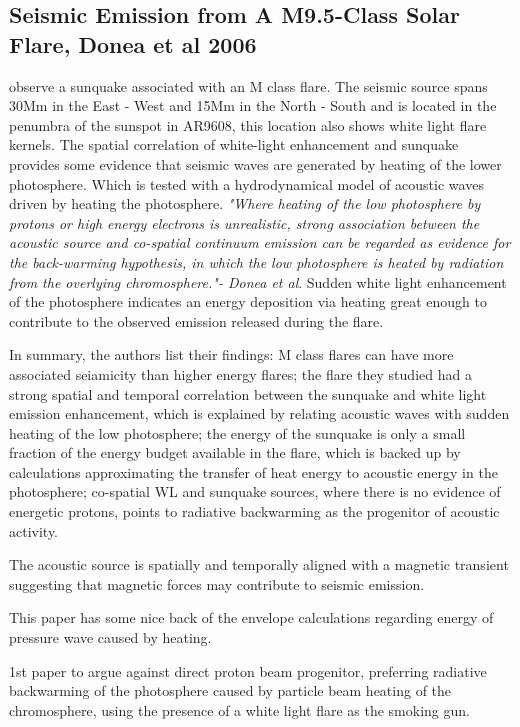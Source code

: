 \subsection{Seismic Emission from A M9.5-Class Solar Flare, Donea et al 2006}
\cite{2006SoPh..239..113D} observe a sunquake associated with an M class flare. The seismic source spans 30Mm in the East - West and 15Mm in the North - South and is located in the penumbra of the sunspot in AR9608, this location also shows white light flare kernels. The spatial correlation of white-light enhancement and sunquake provides some evidence that seismic waves are generated by heating of the lower photosphere. Which is tested with a hydrodynamical model of acoustic waves driven by heating the photosphere. \emph{"Where heating of the low photosphere by protons or high energy electrons is unrealistic, strong association between the acoustic source and co-spatial continuum emission can be regarded as evidence for the back-warming hypothesis, in which the low photosphere is heated by radiation from the overlying chromosphere."- Donea et al}. Sudden white light enhancement of the photosphere indicates an energy deposition via heating great enough to contribute to the observed emission released during the flare. 

In summary, the authors list their findings:
M class flares can have more associated seiamicity than higher energy flares; the flare they studied had a strong spatial and temporal correlation between the sunquake and white light emission enhancement, which is explained by relating acoustic waves with sudden heating of the low photosphere; the energy of the sunquake is only a small fraction of the energy budget available in the flare, which is backed up by calculations approximating the transfer of heat energy to acoustic energy in the photosphere; co-spatial WL and sunquake sources, where there is no evidence of energetic protons, points to radiative backwarming as the progenitor of acoustic activity.

The acoustic source is spatially and temporally aligned with a magnetic transient suggesting that magnetic forces may contribute to seismic emission.  



This paper has some nice back of the envelope calculations regarding energy of pressure wave caused by heating.

1st paper to argue against direct proton beam progenitor, preferring radiative backwarming of the photosphere caused by particle beam heating of the chromosphere, using the presence of a white light flare as the smoking gun.

